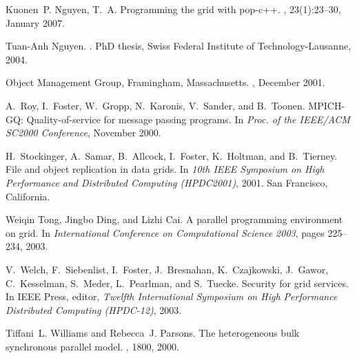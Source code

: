 \documentclass[a4paper, 11pt]{article}
\begin{document}
\begin{thebibliography}{9}
Kuonen~P. Nguyen, T.~A.
\newblock Programming the grid with pop-c++.
, 23(1):23--30,
  January 2007.

Tuan-Anh Nguyen.
.
\newblock PhD thesis, Swiss Federal Institute of Technology-Lausanne, 2004.

{Object Management Group}, Framingham, Massachusetts.
, December 2001.

A.~Roy, I.~Foster, W.~Gropp, N.~Karonis, V.~Sander, and B.~Toonen.
\newblock \mbox{MPICH-GQ}: Quality-of-service for message passing programs.
\newblock In {\em Proc. of the IEEE/ACM SC2000 Conference}, November 2000.

H.~Stockinger, A.~Samar, B.~Allcock, I.~Foster, K.~Holtman, and B.~Tierney.
\newblock File and object replication in data grids.
\newblock In {\em 10th IEEE Symposium on High Performance and Distributed
  Computing (HPDC2001)}, 2001.
\newblock San Francisco, California.

Weiqin Tong, Jingbo Ding, and Lizhi Cai.
\newblock A parallel programming environment on grid.
\newblock In {\em International Conference on Computational Science 2003},
  pages 225--234, 2003.

V.~Welch, F.~Siebenlist, I.~Foster, J.~Bresnahan, K.~Czajkowski, J.~Gawor,
  C.~Kesselman, S.~Meder, L.~Pearlman, and S.~Tuecke.
\newblock Security for grid services.
\newblock In IEEE Press, editor, {\em Twelfth International Symposium on High
  Performance Distributed Computing (HPDC-12)}, 2003.

Tiffani~L. Williams and Rebecca~J. Parsons.
\newblock The heterogeneous bulk synchronous parallel model.
, 1800, 2000.

\end{thebibliography}

\pagebreak
\appendix

\end{document}
